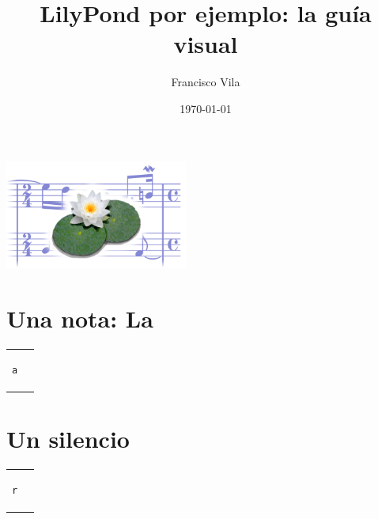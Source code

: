 \documentclass[10pt,a4paper,oneside,headinclude,titlepage]{scrartcl}
\title{LilyPond por ejemplo: la guía visual}
\author{Francisco Vila}
\date{\today}
\begin{document}
\nonfrenchspacing

\begin{titlepage} %
  \makeatletter
  \begin{center}
    \vfill
    \includegraphics[width=60mm]{lily-logo.png}\par
    \vfill
    \textbf{\huge\@title}\par
    {\@date}
    \vfill
    \textbf{\large\@author}
    \vfill
  \end{center}
  \makeatother
\end{titlepage}






\section*{Una nota: La}
\begin{tabular}{m{2cm}m{2cm}}
\begin{verbatim}
a
\end{verbatim}
&
\begin[fragment,notime]{lilypond}
a
\end{lilypond}
\end{tabular}

\section*{Un silencio}
\begin{tabular}{m{2cm}m{2cm}}
\begin{verbatim}
r
\end{verbatim}
&
\begin[fragment,notime]{lilypond}
r
\end{lilypond}
\end{tabular}
\end{document}
